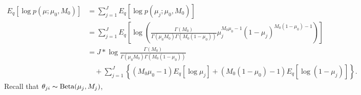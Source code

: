 \documentclass[11pt,reqno]{amsart}
\begin{document}
\begin{equation}
\begin{split}
E_q \left[ \log p\left(\mu ; \mu_0, M_0 \right)\right] &= \sum_{j=1}^{J} E_q  \left[ \log p\left( \mu_j; \mu_0, M_0 \right) \right] \\
&= \sum_{j=1}^{J} E_q  \left[ \log \left( \frac{ \Gamma(M_0) } { \Gamma(\mu_0 M_0) \Gamma(M_0 (1-\mu_0)) } \mu_j^{M_0\mu_0 -1} (1 - \mu_j)^{M_0 ( 1 - \mu_0) - 1} \right) \right] \\
&= J* \log \frac{ \Gamma(M_0) } { \Gamma(\mu_0 M_0) \Gamma(M_0 (1-\mu_0))} \\
&\quad + \sum_{j=1}^{J} \left\lbrace (M_0\mu_0 -1)E_q  \left[ \log \mu_j \right] + (M_0 ( 1 - \mu_0) - 1) E_q  \left[ \log (1 - \mu_j)\right]\right\rbrace.
\end{split}
\end{equation}
Recall that $\theta_{ji} \thicksim \text{Beta}(\mu_j, M_j)$,
\end{document}
